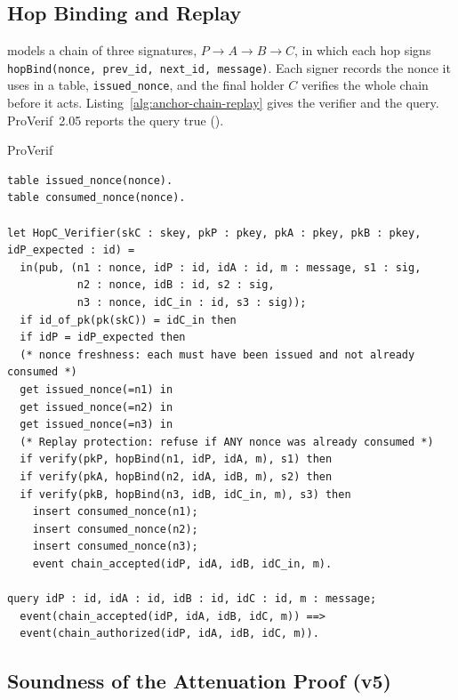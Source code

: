 \documentclass[11pt,a4paper]{article}
\theoremstyle{definition}
\begin{document}
\subsection{Hop Binding and Replay}\label{sec:anchor-chain-replay}

 models a chain of three
signatures, $P \to A \to B \to C$, in which each hop signs
\texttt{hopBind(nonce, prev\_id, next\_id, message)}. Each signer records
the nonce it uses in a table, \texttt{issued\_nonce}, and the final holder
$C$ verifies the whole chain before it acts.
Listing~\ref{alg:anchor-chain-replay} gives the verifier and the query.
ProVerif~2.05 reports the query true
().

\begin{pdlisting}{ProVerif}{}
\begin{lstlisting}[caption={\texttt{chain-replay.pv} (excerpt): the final verifier and the query},label={alg:anchor-chain-replay}]
table issued_nonce(nonce).
table consumed_nonce(nonce).

let HopC_Verifier(skC : skey, pkP : pkey, pkA : pkey, pkB : pkey, idP_expected : id) =
  in(pub, (n1 : nonce, idP : id, idA : id, m : message, s1 : sig,
           n2 : nonce, idB : id, s2 : sig,
           n3 : nonce, idC_in : id, s3 : sig));
  if id_of_pk(pk(skC)) = idC_in then
  if idP = idP_expected then
  (* nonce freshness: each must have been issued and not already consumed *)
  get issued_nonce(=n1) in
  get issued_nonce(=n2) in
  get issued_nonce(=n3) in
  (* Replay protection: refuse if ANY nonce was already consumed *)
  if verify(pkP, hopBind(n1, idP, idA, m), s1) then
  if verify(pkA, hopBind(n2, idA, idB, m), s2) then
  if verify(pkB, hopBind(n3, idB, idC_in, m), s3) then
    insert consumed_nonce(n1);
    insert consumed_nonce(n2);
    insert consumed_nonce(n3);
    event chain_accepted(idP, idA, idB, idC_in, m).

query idP : id, idA : id, idB : id, idC : id, m : message;
  event(chain_accepted(idP, idA, idB, idC, m)) ==>
  event(chain_authorized(idP, idA, idB, idC, m)).
\end{lstlisting}
\end{pdlisting}

\subsection{Soundness of the Attenuation Proof (v5)}\label{sec:attn-soundness}
\end{document}
